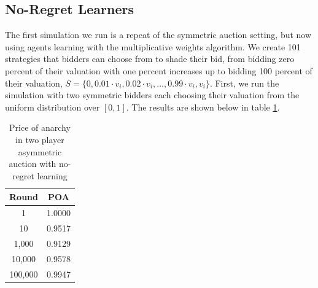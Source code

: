 \documentclass[12pt,twoside]{reedthesis}
\begin{document}
\subsection{No-Regret Learners}
The first simulation we run is a repeat of the symmetric auction setting, but now using agents learning with the multiplicative weights algorithm. We create 101 strategies that bidders can choose from to shade their bid, from bidding zero percent of their valuation with one percent increases up to bidding 100 percent of their valuation, $S = \{ 0, 0.01 \cdot v_i, 0.02 \cdot v_i, \ldots, 0.99 \cdot v_i, v_i \}$. First, we run the simulation with two symmetric bidders each choosing their valuation from the uniform distribution over $[0,1]$. The results are shown below in table \ref{table:3}.

\begin{table}[h!]
	\begin{center}
		\begin{tabular}{ |c|c| }
			\hline
			Round & POA \\
			\hline
			1 & 1.0000 \\
			10 & 0.9517 \\
			1,000 & 0.9129 \\
			10,000 & 0.9578 \\
			100,000 & 0.9947 \\
			\hline
		\end{tabular}
		\caption{Price of anarchy in two player asymmetric auction with no-regret learning}
		\label{table:3}
	\end{center} 
\end{table}
\end{document}
